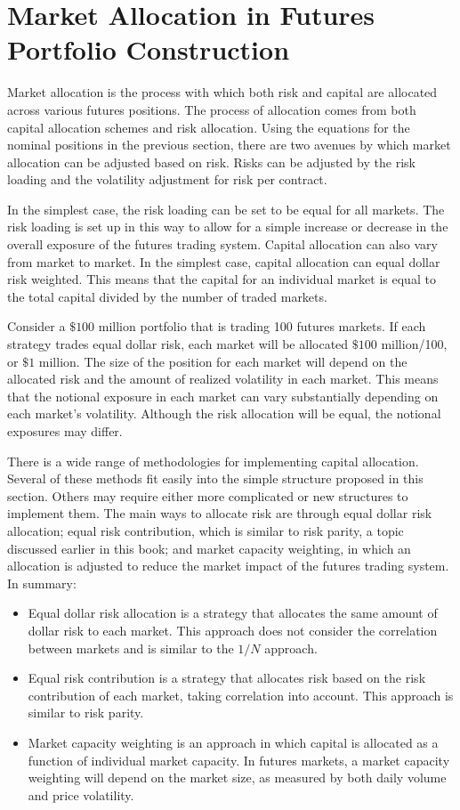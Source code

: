 \documentclass[11pt]{article}
\begin{document}
\section*{Market Allocation in Futures Portfolio Construction}
Market allocation is the process with which both risk and capital are allocated across various futures positions. The process of allocation comes from both capital allocation schemes and risk allocation. Using the equations for the nominal positions in the previous section, there are two avenues by which market allocation can be adjusted based on risk. Risks can be adjusted by the risk loading and the volatility adjustment for risk per contract.

In the simplest case, the risk loading can be set to be equal for all markets. The risk loading is set up in this way to allow for a simple increase or decrease in the overall exposure of the futures trading system. Capital allocation can also vary from market to market. In the simplest case, capital allocation can equal dollar risk weighted. This means that the capital for an individual market is equal to the total capital divided by the number of traded markets.

Consider a $\$ 100$ million portfolio that is trading 100 futures markets. If each strategy trades equal dollar risk, each market will be allocated $\$ 100$ million/100, or $\$ 1$ million. The size of the position for each market will depend on the allocated risk and the amount of realized volatility in each market. This means that the notional exposure in each market can vary substantially depending on each market's volatility. Although the risk allocation will be equal, the notional exposures may differ.

There is a wide range of methodologies for implementing capital allocation. Several of these methods fit easily into the simple structure proposed in this section. Others may require either more complicated or new structures to implement them. The main ways to allocate risk are through equal dollar risk allocation; equal risk contribution, which is similar to risk parity, a topic discussed earlier in this book; and market capacity weighting, in which an allocation is adjusted to reduce the market impact of the futures trading system. In summary:

\begin{itemize}
  \item Equal dollar risk allocation is a strategy that allocates the same amount of dollar risk to each market. This approach does not consider the correlation between markets and is similar to the $1 / N$ approach.
  \item Equal risk contribution is a strategy that allocates risk based on the risk contribution of each market, taking correlation into account. This approach is similar to risk parity.
  \item Market capacity weighting is an approach in which capital is allocated as a function of individual market capacity. In futures markets, a market capacity weighting will depend on the market size, as measured by both daily volume and price volatility.
\end{itemize}
\end{document}
